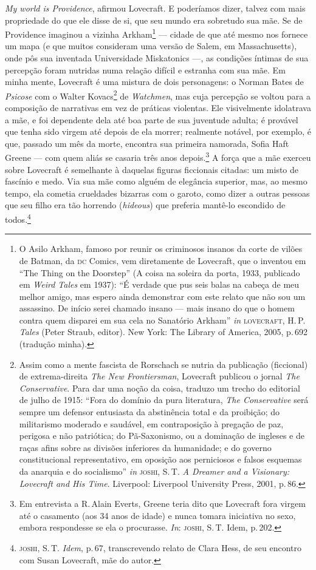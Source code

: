 \emph{My world is Providence}, afirmou Lovecraft. E poderíamos dizer,
talvez com mais propriedade do que ele disse de si, que seu mundo era
sobretudo sua mãe. Se de Providence imaginou a vizinha Arkham\footnote{O
  Asilo Arkham, famoso por reunir os criminosos insanos da corte de
  vilões de Batman, da \textsc{dc} Comics, vem diretamente de Lovecraft, que o
  inventou em ``The Thing on the Doorstep'' (A coisa na soleira da porta, 1933, publicado em
  \emph{Weird Tales} em 1937): ``É verdade que pus seis balas na cabeça
  de meu melhor amigo, mas espero ainda demonstrar com este relato que
  não sou um assassino. De início serei chamado insano --- mais insano
  do que o homem contra quem disparei em sua cela no Sanatório Arkham''
  \emph{in} \textsc{lovecraft}, H.\,P. \emph{Tales} (Peter Straub, editor). New
  York: The Library of America, 2005, p.\,692 (tradução minha).} ---
cidade de que até mesmo nos fornece um mapa (e que muitos consideram uma
versão de Salem, em Massachusetts), onde pôs sua inventada Universidade
Miskatonics ---, as condições íntimas de sua percepção foram nutridas
numa relação difícil e estranha com sua mãe. Em minha mente, Lovecraft é
uma mistura de dois personagens: o Norman Bates de \emph{Psicose} com o
Walter Kovacs\footnote{Assim como a mente fascista de Rorschach se
  nutria da publicação (ficcional) de extrema-direita \emph{The New
  Frontiersman}, Lovecraft publicou o jornal \emph{The Conservative}.
  Para dar uma noção da coisa, traduzo um trecho do editorial de
  julho de 1915: ``Fora do domínio da pura literatura, \emph{The
  Conservative} será sempre um defensor entusiasta da abstinência total
  e da proibição; do militarismo moderado e saudável, em contraposição à
  pregação de paz, perigosa e não patriótica; do Pã-Saxonismo, ou a
  dominação de ingleses e de raças afins sobre as divisões inferiores da
  humanidade; e do governo constitucional representativo, em oposição
  aos perniciosos e falsos esquemas da anarquia e do socialismo''
  \emph{in} \textsc{joshi}, S.\,T. \emph{A Dreamer and a Visionary: Lovecraft and
  His Time}. Liverpool: Liverpool University Press, 2001, p.\,86.} de
\emph{Watchmen}, mas cuja percepção se voltou para a composição de
narrativas em vez de práticas violentas. Ele visivelmente idolatrava a
mãe, e foi dependente dela até boa parte de sua juventude adulta; é
provável que tenha sido virgem até depois de ela morrer; realmente
notável, por exemplo, é que, passado um mês da morte, encontra sua
primeira namorada, Sofia Haft Greene --- com quem aliás se casaria três
anos depois.\footnote{Em entrevista a R.\,Alain Everts, Greene teria dito
  que Lovecraft fora virgem até o casamento (aos 34 anos de idade) e
  nunca tomara iniciativa no sexo, embora respondesse se ela o
  procurasse. \emph{In}: \textsc{joshi}, S.\,T. Idem, p.\,202.} A força que a mãe
exerceu sobre Lovecraft é semelhante à daquelas figuras ficcionais
citadas: um misto de fascínio e medo. Via sua mãe como alguém de
elegância superior, mas, ao mesmo tempo, ela cometia crueldades bizarras
com o garoto, como dizer a outras pessoas que seu filho era tão horrendo
(\emph{hideous}) que preferia mantê-lo escondido de todos.\footnote{\textsc{joshi}, S.\,T. \emph{Idem}, p.\,67, transcrevendo relato de Clara Hess, de seu
  encontro com Susan Lovecraft, mãe do autor.}

